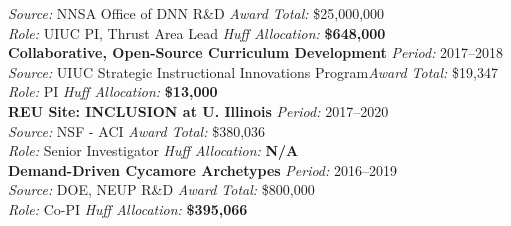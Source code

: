 \documentclass[margin,line]{resume}
\begin{document}
\begin{resume}
    \textsl{Source:} NNSA Office of DNN R\&D \hfill \textsl{Award Total:} \$25,000,000\\
    \textsl{Role:} UIUC PI, Thrust Area Lead  \hfill \textsl{Huff Allocation:} \textbf{\$648,000}\vspace{2mm}\\%
    \textbf{Collaborative, Open-Source Curriculum Development} \hfill \textsl{Period:} 2017--2018\\
    \textsl{Source:} UIUC Strategic Instructional Innovations Program\hfill \textsl{Award Total:} \$19,347\\
    \textsl{Role:} PI \hfill \textsl{Huff Allocation:} \textbf{\$13,000}\vspace{2mm}\\%
    \textbf{REU Site: INCLUSION at U. Illinois} \hfill \textsl{Period:} 
    2017--2020\\
    \textsl{Source:} NSF - ACI \hfill \textsl{Award Total:} \$380,036\\
    \textsl{Role:} Senior Investigator \hfill \textsl{Huff Allocation:} \textbf{N/A}\vspace{2mm}\\%
    \textbf{Demand-Driven Cycamore Archetypes} \hfill \textsl{Period:} 2016--2019\\
    \textsl{Source:} DOE, NEUP R\&D \hfill \textsl{Award Total:} \$800,000\\
    \textsl{Role:} Co-PI \hfill \textsl{Huff Allocation:} \textbf{\$395,066}\vspace{2mm}\\%

\end{resume}
\end{document}
